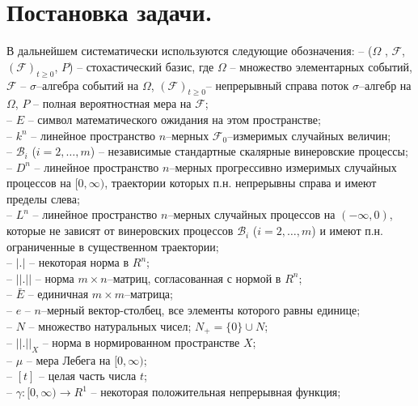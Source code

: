 
\section{Постановка задачи.}\label{kri-s1}
В дальнейшем систематически
используются следующие обозначения:
-- ($\Omega$ , ${\mathcal F}$, $({\mathcal F})_{t\ge0}$, $P$)
-- стохастический базис, где $ \Omega $ -- множество элементарных
событий, ${\mathcal F}$ -- $\sigma$--алгебра событий на $\Omega$,
$({\mathcal F})_{t\ge0}$-- непрерывный справа поток $\sigma$--алгебр
на $\Omega$, $P$ -- полная вероятностная мера на $\mathcal{F}$;
\\ -- $E$ --
символ математического ожидания на этом пространстве;\\
-- $k^n$ -- линейное пространство  $n$--мерных
${\mathcal F}_0$--измеримых случайных величин;\\
  --  $\mathcal B_i$ ($i=2,\dots,m$)
-- независимые стандартные скалярные винеровские процессы;\\
-- $D^n$ -- линейное пространство $n$--мерных прогрессивно измеримых
случайных процессов на $[0, \infty )$, траектории которых п.н.
непрерывны справа и имеют пределы слева;\\
-- $L^n$ -- линейное пространство $n$--мерных случайных
процессов на $(-\infty , 0)$, которые не зависят от винеровских процессов
$\mathcal B_i$ ($i=2,\dots,m$) и имеют п.н. ограниченные в
существенном траектории;\\
-- $|.|$ -- некоторая норма в $R^n$;\\
 -- $||.||$ -- норма $m\times n$--матриц, согласованная с нормой в
$R^n$;\\
 -- $\bar E$ -- единичная $m \times m$--матрица;\\
 -- $e$ --
$n$--мерный вектор-столбец, все элементы которого равны единице;\\
  -- $N$ --
множество натуральных чисел; $N_+ = \{0\}\cup N$;\\
-- $||.||_X$ -- норма в нормированном
пространстве $X$;\\
-- $\mu $ -- мера Лебега на $[0, \infty)$;\\
-- $[t]$
-- целая часть числа $t$; \\
--  $\gamma :[0, \infty) \rightarrow R^1 $ -- некоторая
положительная непрерывная функция;\\
